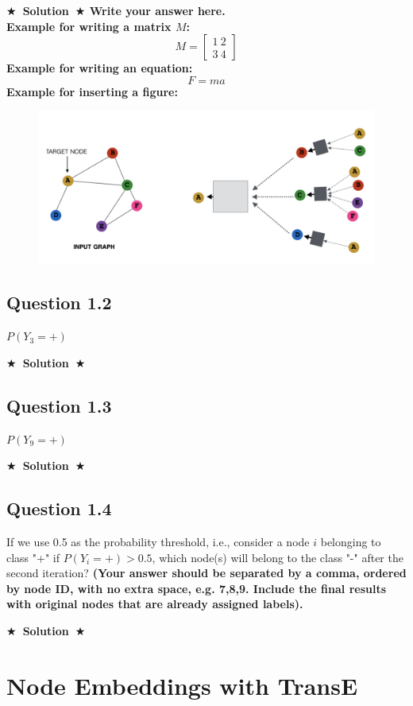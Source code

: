 \documentclass{article}
\newcommand{\Solution}[1]{{\medskip \color{black} \bf $\bigstar$~\sf \textbf{Solution}~$\bigstar$ \sf #1 } \bigskip}
\begin{document}
\Solution{Write your answer here. \\ Example for writing a matrix $M$: \\
 \[M = 
    \begin{bmatrix}
    1 \ 2   \\
    3 \ 4
    \end{bmatrix}
\]
Example for writing an equation:
\begin{equation}
    F=ma
\end{equation}
Example for inserting a figure: 
\begin{figure}[!htb]
\centering
  \includegraphics[width=0.8\columnwidth]{Sample_Image.png}
  \label{fig:Q1.1}
\end{figure}
}

\subsection*{Question 1.2}
$P(Y_3 = +)$

\Solution{}

\subsection*{Question 1.3}
$P(Y_9 = +)$

\Solution{}

\subsection*{Question 1.4}
If we use 0.5 as the probability threshold, i.e., consider a node $i$ belonging to class "+" if $P(Y_i = +) > 0.5$, which node(s) will belong to the class "-" after the second iteration? \textbf{(Your answer should be separated by a comma, ordered by node ID, with no extra space, e.g. 7,8,9. Include the final results with original nodes that are already assigned labels).}

\Solution{}


\section{Node Embeddings with TransE}
\end{document}
